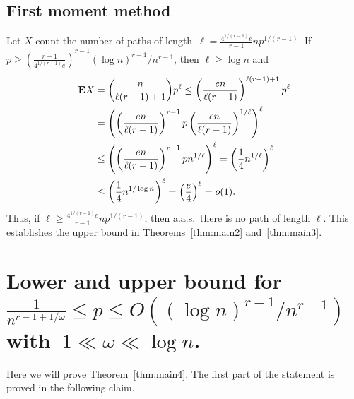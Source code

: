 \documentclass[12pt,reqno]{amsart}
\theoremstyle{remark}
\def\E{\mbox{{\bf E}}}
\def\E{\mbox{{\bf E}}}
\begin{document}
\subsection{First moment method}\label{sec:upper_bound}
Let $X$ count the number of paths of length~$\ell =  \frac{4^{1/(r-1)}e}{r-1}np^{1/(r-1)}$. If $p \ge (\frac{r-1}{4^{1/(r-1)}e})^{r-1}(\log n)^{r-1}/n^{r-1}$, then $\ell  \ge \log n$ and
\begin{align*}
\E X &= \binom{n}{\ell(r-1)+1}p^\ell
\le \left(\frac{en}{\ell(r-1)}\right)^{\ell(r-1)+1}p^\ell\\
&= \left(\left(\frac{en}{\ell(r-1)}\right)^{r-1}p  \left(\frac{en}{\ell(r-1)}\right)^{1/\ell} \right)^\ell\\
&\le \left(\left(\frac{en}{\ell(r-1)}\right)^{r-1}p  n^{1/\ell} \right)^\ell
= \left(\frac{1}{4} n^{1/\ell}\right)^{\ell}\\
&\le \left(\frac{1}{4} n^{1/\log n}\right)^{\ell}
= \left(\frac{e}{4}\right)^{\ell} = o(1).
\end{align*}
Thus, if $\ell \ge  \frac{4^{1/(r-1)}e}{r-1}np^{1/(r-1)}$, then a.a.s.\  there is no path of length $\ell$.
This establishes the upper bound in Theorems~\ref{thm:main2} and~\ref{thm:main3}.



\section{Lower and upper bound for $\frac{1}{n^{r-1+1/\omega}} \le p \le O((\log n)^{r-1}/n^{r-1})$ with~$1 \ll \omega \ll \log n$.}\label{sec:7}

Here we will prove Theorem~\ref{thm:main4}. The first part of the statement is proved in the following claim.
\end{document}
